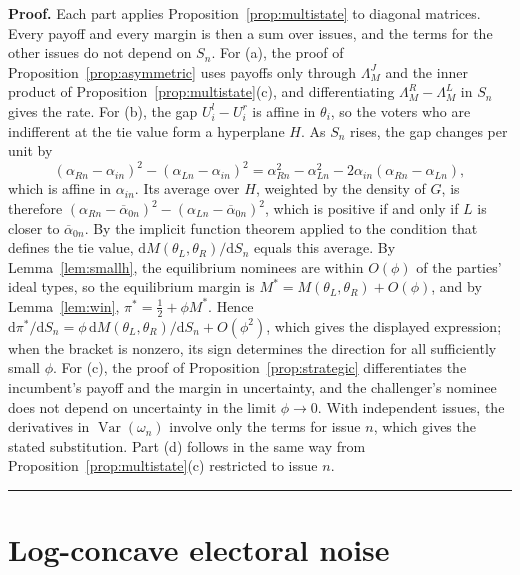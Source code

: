 \documentclass[12pt,letterpaper]{article}
\newenvironment{proof}[1][Proof]{\noindent\textbf{#1.} }{\ \rule{0.5em}{0.5em}}
\begin{document}
\begin{proof}
Each part applies Proposition~\ref{prop:multistate} to diagonal matrices. Every payoff and every margin is then a sum over issues, and the terms for the other issues do not depend on $S_n$. For (a), the proof of Proposition~\ref{prop:asymmetric} uses payoffs only through $\Lambda_M^J$ and the inner product of Proposition~\ref{prop:multistate}(c), and differentiating $\Lambda_M^R-\Lambda_M^L$ in $S_n$ gives the rate. For (b), the gap $U_i^l-U_i^r$ is affine in $\theta_i$, so the voters who are indifferent at the tie value form a hyperplane $H$. As $S_n$ rises, the gap changes per unit by
\[
(\alpha_{Rn}-\alpha_{in})^2-(\alpha_{Ln}-\alpha_{in})^2=\alpha_{Rn}^2-\alpha_{Ln}^2-2\alpha_{in}(\alpha_{Rn}-\alpha_{Ln}),
\]
which is affine in $\alpha_{in}$. Its average over $H$, weighted by the density of $G$, is therefore $(\alpha_{Rn}-\overline{\alpha}_{0n})^2-(\alpha_{Ln}-\overline{\alpha}_{0n})^2$, which is positive if and only if $L$ is closer to $\overline{\alpha}_{0n}$. By the implicit function theorem applied to the condition that defines the tie value, $\mathrm{d}M(\theta_L,\theta_R)/\mathrm{d}S_n$ equals this average. By Lemma~\ref{lem:smallh}, the equilibrium nominees are within $O(\phi)$ of the parties' ideal types, so the equilibrium margin is $M^*=M(\theta_L,\theta_R)+O(\phi)$, and by Lemma~\ref{lem:win}, $\pi^*=\tfrac12+\phi M^*$. Hence $\mathrm{d}\pi^*/\mathrm{d}S_n=\phi\,\mathrm{d}M(\theta_L,\theta_R)/\mathrm{d}S_n+O(\phi^2)$, which gives the displayed expression; when the bracket is nonzero, its sign determines the direction for all sufficiently small $\phi$. For (c), the proof of Proposition~\ref{prop:strategic} differentiates the incumbent's payoff and the margin in uncertainty, and the challenger's nominee does not depend on uncertainty in the limit $\phi\to0$. With independent issues, the derivatives in $\operatorname{Var}(\omega_n)$ involve only the terms for issue $n$, which gives the stated substitution. Part (d) follows in the same way from Proposition~\ref{prop:multistate}(c) restricted to issue $n$.
\end{proof}

\section{Log-concave electoral noise}
\end{document}
